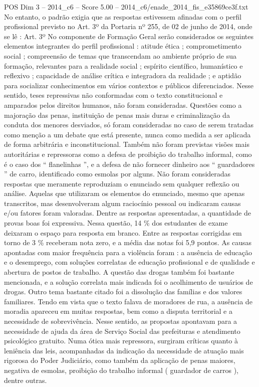 \begin{textsample}{POS Dim 3 – 2014\_c6 – Score 5.00 – 2014\_c6/enade\_2014\_fis\_e35869ce3f.txt}
No entanto, o padrão exigia que as respostas estivessem afinadas com o perfil profissional previsto no Art. 3º da Portaria nº 255, de 02 de junho de 2014, onde se lê : Art. 3º No componente de Formação Geral serão considerados os seguintes elementos integrantes do perfil profissional : atitude ética ; comprometimento social ; compreensão de temas que transcendam ao ambiente próprio de sua formação, relevantes para a realidade social ; espírito científico, humanístico e reflexivo ; capacidade de análise crítica e integradora da realidade ; e aptidão para socializar conhecimentos em vários contextos e públicos diferenciados.
Nesse sentido, teses repressivas não conformadas com o texto constitucional e amparados pelos direitos humanos, não foram consideradas.
Questões como a majoração das penas, instituição de penas mais duras e criminalização da conduta dos menores desviados, só foram consideradas no caso de serem tratadas como menção a um debate que está presente, nunca como medida a ser aplicada de forma arbitrária e inconstitucional.
Também não foram previstas visões mais autoritárias e repressoras como a defesa de proibição do trabalho informal, como é o caso dos “ flanelinhas ”, e a defesa de não fornecer dinheiro aos “ guardadores ” de carro, identificado como esmolas por alguns.
Não foram consideradas respostas que meramente reproduziam o enunciado sem qualquer reflexão ou análise.
Aquelas que utilizaram os elementos do enunciado, mesmo que apenas transcritos, mas desenvolveram algum raciocínio pessoal ou indicaram causas e/ou fatores foram valoradas.
Dentre as respostas apresentadas, a quantidade de provas boas foi expressiva.
Nessa questão, 14 \% dos estudantes de exame deixaram o espaço para resposta em branco.
Entre as respostas corrigidas em torno de 3 \% receberam nota zero, e a média das notas foi 5,9 pontos.
As causas apontadas com maior frequência para a violência foram : a ausência de educação e o desemprego, com soluções correlatas de educação profissional e de qualidade e abertura de postos de trabalho.
A questão das drogas também foi bastante mencionada, e a solução correlata mais indicada foi o acolhimento de usuários de drogas.
Outro tema bastante citado foi a dissolução das famílias e dos valores familiares.
Tendo em vista que o texto falava de moradores de rua, a ausência de moradia apareceu em muitas respostas, bem como a disputa territorial e a necessidade de sobrevivência.
Nesse sentido, as propostas apontavam para a necessidade de ajuda da área de Serviço Social das prefeituras e atendimento psicológico gratuito.
Numa ótica mais repressora, surgiram críticas quanto à leniência das leis, acompanhadas da indicação da necessidade de atuação mais rigorosa do Poder Judiciário, como também da aplicação de penas maiores, negativa de esmolas, proibição do trabalho informal ( guardador de carros ), dentre outras.

\end{textsample}
